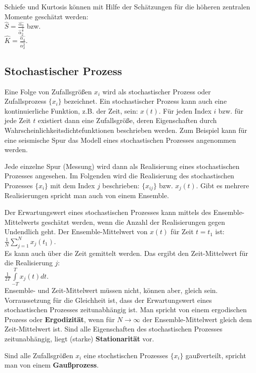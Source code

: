 Schiefe und Kurtosis können mit Hilfe der Schätzungen für die höheren zentralen Momente geschätzt werden:\\
 $\hat S=\frac {\hat{\alpha_3}}{\hat{\alpha}_2^{\frac{3}{2}}}$ 
bzw.\\
 $\hat K=\frac {\hat{\alpha_4}}{\hat{\alpha_2^2}}$.


\subsection{Stochastischer Prozess}

Eine Folge von Zufallsgrößen ${x_i}$ wird als stochastischer Prozess oder Zufallsprozess $\{x_i\}$ bezeichnet. Ein stochastischer Prozess kann auch eine kontinuierliche Funktion, z.B. der Zeit, sein: $x(t)$. Für jeden Index $i$ bzw. für jede Zeit $t$ existiert dann eine Zufallsgröße, deren Eigenschaften durch Wahrscheinlichkeitsdichtefunktionen beschrieben werden. Zum Beispiel kann für eine seismische Spur das Modell eines stochastischen Prozesses angenommen werden.  

Jede einzelne Spur (Messung) wird dann als Realisierung eines stochastischen Prozesses angesehen. 
Im Folgenden wird die Realisierung des stochastischen Prozesses $\{x_i\}$ mit dem Index $j$ beschrieben: $\{x_{ij}\}$ bzw. $x_j(t)$. Gibt es mehrere Realisierungen spricht man auch von einem Ensemble.

Der Erwartungswert eines stochastischen Prozesses kann mittels des Ensemble-Mittelwerts geschätzt werden, wenn die Anzahl der Realisierungen gegen Undendlich geht. Der Ensemble-Mittelwert von $x(t)$ für Zeit $t=t_1$ ist:\\ 
$\frac{1}{N}\sum\limits_{j=1}^{N}x_j(t_1)$.\\
Es kann auch über die Zeit gemittelt werden. Das ergibt den Zeit-Mittelwert für die Realisierung $j$:\\ 
$\frac{1}{2T}\int\limits_{-T}^{T}x_j(t)dt$.\\
Ensemble- und Zeit-Mittelwert müssen nicht, können aber, gleich sein. Vorraussetzung für die Gleichheit ist, dass der Erwartungswert eines stochastischen Prozesses zeitunabhängig ist. Man spricht von einem ergodischen Prozess oder {\bf Ergodizität}, wenn für $N \to \infty$ der Ensemble-Mittelwert gleich dem Zeit-Mittelwert ist. Sind alle Eigenschaften des stochastischen Prozesses zeitunabhängig, liegt (starke) {\bf Stationarität} vor.  

Sind alle Zufallsgrößen $x_i$  eine stochstischen Prozesses $\{x_i\}$ gaußverteilt, spricht man von einem {\bf Gaußprozess}.

